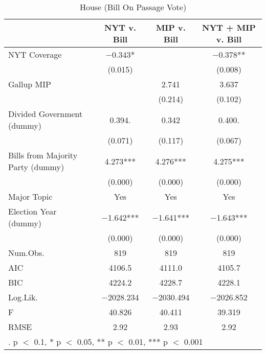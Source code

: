 \documentclass[here]{article}
\begin{document}
\begin{table}[h]

  \caption{House (Bill On Passage Vote)}
  \centering
  \begin{tabular}[t]{lccc}
  \toprule
    & NYT v. Bill & MIP v. Bill & NYT + MIP v. Bill\\
  \midrule
  NYT Coverage & \num{-0.343}* &  & \num{-0.378}**\\
   & (\num{0.015}) &  & (\num{0.008})\\
  Gallup MIP &  & \num{2.741} & \num{3.637}\\
   &  & (\num{0.214}) & (\num{0.102})\\
  Divided Government (dummy) & \num{0.394}. & \num{0.342} & \num{0.400}.\\
   & (\num{0.071}) & (\num{0.117}) & (\num{0.067})\\
  Bills from Majority Party (dummy) & \num{4.273}*** & \num{4.276}*** & \num{4.275}***\\
   & (\num{0.000}) & (\num{0.000}) & \vphantom{1} (\num{0.000})\\
  Major Topic & Yes & Yes & Yes\\
  Election Year (dummy) & \num{-1.642}*** & \num{-1.641}*** & \num{-1.643}***\\
   & (\num{0.000}) & (\num{0.000}) & (\num{0.000})\\
  Num.Obs. & \num{819} & \num{819} & \num{819}\\
  \midrule
  AIC & \num{4106.5} & \num{4111.0} & \num{4105.7}\\
  BIC & \num{4224.2} & \num{4228.7} & \num{4228.1}\\
  Log.Lik. & \num{-2028.234} & \num{-2030.494} & \num{-2026.852}\\
  F & \num{40.826} & \num{40.411} & \num{39.319}\\
  RMSE & \num{2.92} & \num{2.93} & \num{2.92}\\
  \bottomrule
  \multicolumn{4}{l}{\rule{0pt}{1em}. p $<$ 0.1, * p $<$ 0.05, ** p $<$ 0.01, *** p $<$ 0.001}\\
  \end{tabular}
  \end{table}
\end{document}

